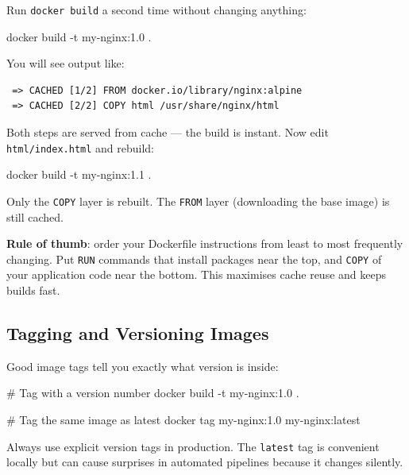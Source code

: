 \documentclass[11pt,american,a4paper,openany]{book}
\newenvironment{Shaded}{}{}
\newcommand{\NormalTok}[1]{#1}
\begin{document}
Run \texttt{docker\ build} a second time without changing anything:

\begin{Shaded}
\begin{Highlighting}[]
\NormalTok{docker build {-}t my{-}nginx:1.0 .}
\end{Highlighting}
\end{Shaded}

You will see output like:

\begin{verbatim}
 => CACHED [1/2] FROM docker.io/library/nginx:alpine
 => CACHED [2/2] COPY html /usr/share/nginx/html
\end{verbatim}

Both steps are served from cache --- the build is instant. Now edit
\texttt{html/index.html} and rebuild:

\begin{Shaded}
\begin{Highlighting}[]
\NormalTok{docker build {-}t my{-}nginx:1.1 .}
\end{Highlighting}
\end{Shaded}

Only the \texttt{COPY} layer is rebuilt. The \texttt{FROM} layer
(downloading the base image) is still cached.

\textbf{Rule of thumb}: order your Dockerfile instructions from least to
most frequently changing. Put \texttt{RUN} commands that install
packages near the top, and \texttt{COPY} of your application code near
the bottom. This maximises cache reuse and keeps builds fast.

\subsection{Tagging and Versioning
Images}\label{tagging-and-versioning-images}

Good image tags tell you exactly what version is inside:

\begin{Shaded}
\begin{Highlighting}[]
\NormalTok{\# Tag with a version number}
\NormalTok{docker build {-}t my{-}nginx:1.0 .}

\NormalTok{\# Tag the same image as latest}
\NormalTok{docker tag my{-}nginx:1.0 my{-}nginx:latest}
\end{Highlighting}
\end{Shaded}

Always use explicit version tags in production. The \texttt{latest} tag
is convenient locally but can cause surprises in automated pipelines
because it changes silently.
\end{document}

